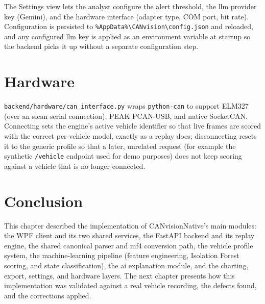 The Settings view lets the analyst configure the alert threshold, the \gls{llm} provider key (Gemini), and the hardware interface (adapter type, COM port, bit rate). Configuration is persisted to \texttt{\%AppData\%\textbackslash CANvision\textbackslash config.json} and reloaded, and any configured \gls{llm} key is applied as an environment variable at startup so the backend picks it up without a separate configuration step.

\section{Hardware}

\texttt{backend/hardware/can\_interface.py} wraps \texttt{python-can} to support ELM327 (over an slcan serial connection), PEAK PCAN-USB, and native SocketCAN. Connecting sets the engine's active vehicle identifier so that live frames are scored with the correct per-vehicle model, exactly as a replay does; disconnecting resets it to the generic profile so that a later, unrelated request (for example the synthetic \texttt{/vehicle} endpoint used for demo purposes) does not keep scoring against a vehicle that is no longer connected.

\section{Conclusion}

This chapter described the implementation of CANvisionNative's main modules: the WPF client and its two shared services, the FastAPI backend and its replay engine, the shared canonical parser and \gls{mf4} conversion path, the vehicle profile system, the machine-learning pipeline (feature engineering, Isolation Forest scoring, and state classification), the \gls{ai} explanation module, and the charting, export, settings, and hardware layers. The next chapter presents how this implementation was validated against a real vehicle recording, the defects found, and the corrections applied.
